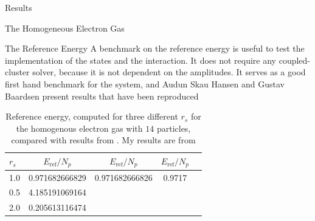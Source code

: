 \documentclass[twoside,english]{uiofysmaster}
\begin{document}
\begin{chapter}{Results}
\begin{section}{The Homogeneous Electron Gas}
		\begin{subsection}{The Reference Energy}
			A benchmark on the reference energy is useful to test the implementation of the states and the interaction. It does not require any coupled-cluster solver, because it is not dependent on the amplitudes. It serves as a good first hand benchmark for the system, and Audun Skau Hansen and Gustav Baardsen \cite{Baardsen,Audun} present results that have been reproduced 
			\begin{table}[H]
				\begin{center}
					\begin{tabular}[center]{l | c  c  c  r}
						$r_s$ & $E_{\text{ref}} / N_p$ & $E_{\text{ref}} / N_p$ \cite{Baardsen} & $E_{\text{ref}} / N_p$ \cite{Audun} \\
						\hline
						1.0 & 0.971682666829 & 0.971682666826 & 0.9717 \\
						0.5 & 4.185191069164 &  &  \\
						2.0 & 0.205613116474 &  &  
					\end{tabular}
				\end{center}
				\caption{Reference energy, computed for three different $r_s$ for the homogenous electron gas with $14$ particles, compared with results from \cite{Baardsen,Audun}. My results are from \cite{WholmenGithub}}
				\label{table:ReferenceEnergyHEG}
			\end{table}

		\end{subsection}


\end{section}
\end{chapter}
\end{document}
